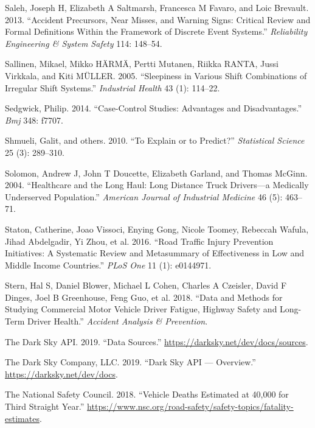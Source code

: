 \documentclass[12pt]{book}
\numberwithin{equation}{chapter}
\begin{document}
\leavevmode\hypertarget{ref-saleh2013accident}{}%
Saleh, Joseph H, Elizabeth A Saltmarsh, Francesca M Favaro, and Loic Brevault. 2013. ``Accident Precursors, Near Misses, and Warning Signs: Critical Review and Formal Definitions Within the Framework of Discrete Event Systems.'' \emph{Reliability Engineering \& System Safety} 114: 148--54.

\leavevmode\hypertarget{ref-sallinen2005sleepiness}{}%
Sallinen, Mikael, Mikko HÄRMÄ, Pertti Mutanen, Riikka RANTA, Jussi Virkkala, and Kiti MÜLLER. 2005. ``Sleepiness in Various Shift Combinations of Irregular Shift Systems.'' \emph{Industrial Health} 43 (1): 114--22.

\leavevmode\hypertarget{ref-sedgwick2014case}{}%
Sedgwick, Philip. 2014. ``Case-Control Studies: Advantages and Disadvantages.'' \emph{Bmj} 348: f7707.

\leavevmode\hypertarget{ref-shmueli2010explain}{}%
Shmueli, Galit, and others. 2010. ``To Explain or to Predict?'' \emph{Statistical Science} 25 (3): 289--310.

\leavevmode\hypertarget{ref-solomon2004healthcare}{}%
Solomon, Andrew J, John T Doucette, Elizabeth Garland, and Thomas McGinn. 2004. ``Healthcare and the Long Haul: Long Distance Truck Drivers---a Medically Underserved Population.'' \emph{American Journal of Industrial Medicine} 46 (5): 463--71.

\leavevmode\hypertarget{ref-staton2016road}{}%
Staton, Catherine, Joao Vissoci, Enying Gong, Nicole Toomey, Rebeccah Wafula, Jihad Abdelgadir, Yi Zhou, et al. 2016. ``Road Traffic Injury Prevention Initiatives: A Systematic Review and Metasummary of Effectiveness in Low and Middle Income Countries.'' \emph{PLoS One} 11 (1): e0144971.

\leavevmode\hypertarget{ref-stern2018data}{}%
Stern, Hal S, Daniel Blower, Michael L Cohen, Charles A Czeisler, David F Dinges, Joel B Greenhouse, Feng Guo, et al. 2018. ``Data and Methods for Studying Commercial Motor Vehicle Driver Fatigue, Highway Safety and Long-Term Driver Health.'' \emph{Accident Analysis \& Prevention}.

\leavevmode\hypertarget{ref-darkskyds}{}%
The Dark Sky API. 2019. ``Data Sources.'' \url{https://darksky.net/dev/docs/sources}.

\leavevmode\hypertarget{ref-darksky}{}%
The Dark Sky Company, LLC. 2019. ``Dark Sky API --- Overview.'' \url{https://darksky.net/dev/docs}.

\leavevmode\hypertarget{ref-nsc2018}{}%
The National Safety Council. 2018. ``Vehicle Deaths Estimated at 40,000 for Third Straight Year.'' \url{https://www.nsc.org/road-safety/safety-topics/fatality-estimates}.
\end{document}
